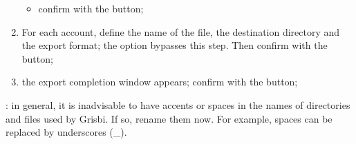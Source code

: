 \begin{enumerate}
\begin{itemize}
			\item confirm with the  button;
		\end{itemize}
	\item For each account, define the name of the file, the destination directory and the export format; the option  bypasses this step. Then confirm with the  button;
	\item the export completion window appears; confirm with the  button;
\end{enumerate}
	
\Attention{}: in general, it is inadvisable to have accents or spaces in the names of directories and files used by Grisbi. If so, rename them now. For example, spaces can be replaced by underscores (\_).
